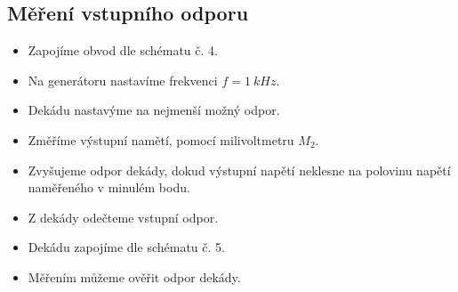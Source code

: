   \subsection*{Měření vstupního odporu}
    \begin{itemize}
      \item
        Zapojíme obvod dle schématu č. 4.
      \item
        Na generátoru nastavíme frekvenci $f = 1~kHz$.
      \item
      	Dekádu nastavýme na nejmenší možný odpor.
      \item
      	Změříme výstupní namětí, pomocí milivoltmetru $M_2$.
      \item
      	Zvyšujeme odpor dekády, dokud výstupní napětí neklesne na polovinu napětí naměřeného v minulém bodu.
      \item
      	Z dekády odečteme vstupní odpor.
      \item
      	Dekádu zapojíme dle schématu č. 5.
      \item
      	Měřením můžeme ověřit odpor dekády.
		\end{itemize}
